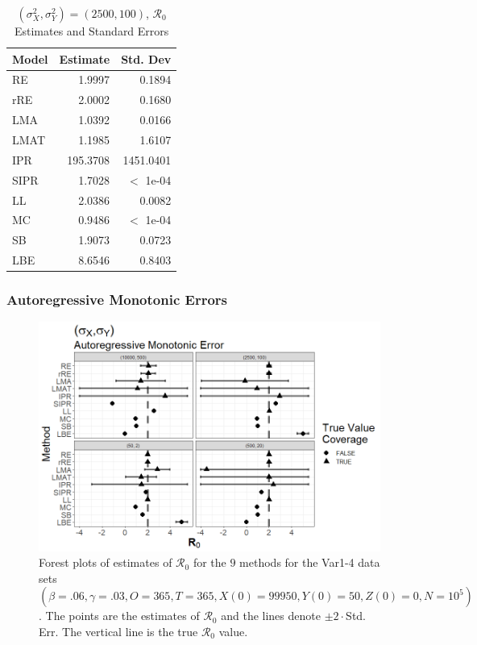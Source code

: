 \documentclass[12pt]{article}
\newcommand{\xxsir}{\ensuremath{9} } %
\newcommand{\rr}{\ensuremath{\mathcal{R}_0}}
\begin{document}
\begin{table}[H]
	
	
	\centering
	\begin{tabular}[t]{l|r|r}
		\hline
		Model & Estimate & Std. Dev\\
		\hline
		RE & 1.9997 & 0.1894\\
		\hline
		rRE & 2.0002 & 0.1680\\
		\hline
		LMA & 1.0392 & 0.0166\\
		\hline
		LMAT & 1.1985 & 1.6107\\
		\hline
		IPR & 195.3708 & 1451.0401\\
		\hline
		SIPR & 1.7028 & $<$ 1e-04\\
		\hline
		LL & 2.0386 & 0.0082\\
		\hline
		MC & 0.9486 & $<$ 1e-04\\
		\hline
		SB & 1.9073 & 0.0723\\
		\hline
		LBE & 8.6546 & 0.8403\\
		\hline
	\end{tabular}
	\caption{$(\sigma^2_X, \sigma^2_Y) = (2500, 100)$, $\rr$ Estimates and Standard Errors}
\end{table}

\subsubsection{Autoregressive Monotonic Errors}

\begin{figure}[H]
	\begin{center}
		\includegraphics[scale=0.5]{images/var_arm.tiff}
		\caption{Forest plots of estimates of $\rr$ for the \xxsir methods for the Var1-4 data sets $(\beta=.06, \gamma=.03, O=365, T=365, X(0)=99950, Y(0)=50, Z(0)=0, N=10^5)$.  The points are the estimates of $\rr$ and the lines denote $\pm 2\cdot $Std. Err.  The vertical line is the true $\rr$ value.}
	\end{center}
\end{figure}
\end{document}
